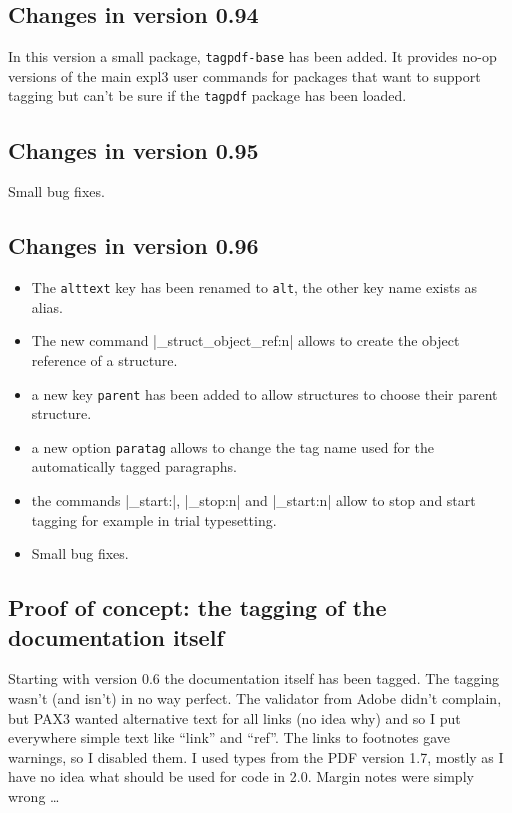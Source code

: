 \documentclass[DIV=12,parskip=half-,bibliography=totoc]{scrartcl}
\newcommand\pkg[1]{\texttt{#1}}
\newcommand\PDF{PDF}
\begin{document}
\subsection{Changes in version 0.94}

In this version a small package, \pkg{tagpdf-base} has been added. It provides
no-op versions of the main expl3 user commands for packages that want to support
tagging but can't be sure if the \pkg{tagpdf} package has been loaded.

\subsection{Changes in version 0.95}

Small bug fixes.

\subsection{Changes in version 0.96}

\begin{itemize}
\item The \texttt{alttext} key has been renamed to \texttt{alt}, the other key name exists as alias.

\item The new command |\tag_struct_object_ref:n| allows to
   create the object reference of a structure.

\item a new key \texttt{parent} has been added
   to allow structures to choose their parent structure.

\item a new option \texttt{paratag} allows to change the tag name used for the
   automatically tagged paragraphs.

\item the commands |\tag_start:|, |\tag_stop:n| and |\tag_start:n| allow
    to stop and start tagging for example in trial typesetting.

\item Small bug fixes.
\end{itemize}

\subsection{Proof of concept: the tagging of the documentation itself}

Starting with version 0.6 the documentation itself has been tagged. The tagging wasn't (and isn't) in no way perfect. The validator from Adobe didn't complain, but PAX3 wanted alternative text for all links (no idea why) and so I put everywhere simple text like \enquote{link} and \enquote{ref}. The links to footnotes gave warnings, so I disabled them. I used types from the \PDF{} version 1.7, mostly as I have no idea what should be used for code in 2.0. Margin notes were simply wrong \ldots
\end{document}
